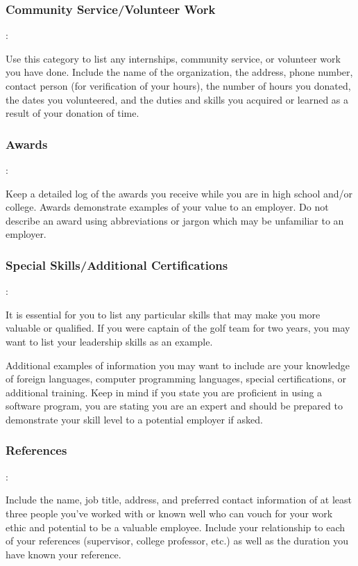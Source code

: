 \subsubsection*{Community Service/Volunteer Work}:

Use this category to list any internships, community service, or volunteer work you have done. Include the name of the organization, the address, phone number, contact person (for verification of your hours), the number of hours you donated, the dates you volunteered, and the duties and skills you acquired or learned as a result of your donation of time.

\subsubsection*{Awards}:

Keep a detailed log of the awards you receive while you are in high school and/or college. Awards demonstrate examples of your value to an employer. Do not describe an award using abbreviations or jargon which may be unfamiliar to an employer.

\subsubsection*{Special Skills/Additional Certifications}:

It is essential for you to list any particular skills that may make you more valuable or qualified. If you were captain of the golf team for two years, you may want to list your leadership skills as an example.

Additional examples of information you may want to include are your knowledge of foreign languages, computer programming languages, special certifications, or additional training. Keep in mind if you state you are proficient in using a software program, you are stating you are an expert and should be prepared to demonstrate your skill level to a potential employer if asked.

\subsubsection*{References}:

Include the name, job title, address, and preferred contact information of at least three people you've worked with or known well who can vouch for your work ethic and potential to be a valuable employee. Include your relationship to each of your references (supervisor, college professor, etc.) as well as the duration you have known your reference.

